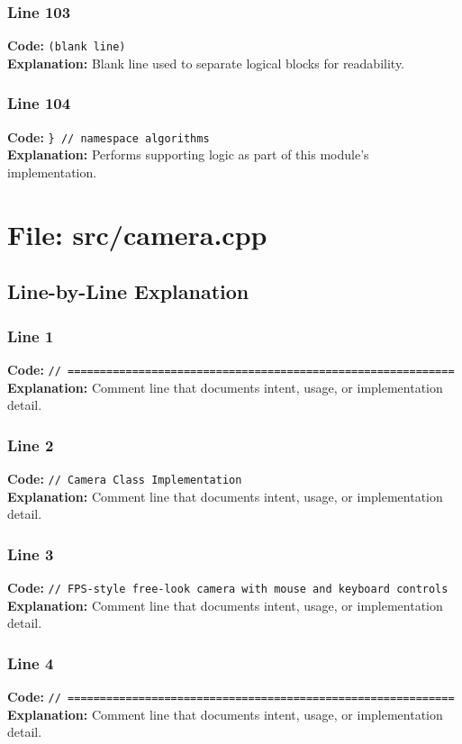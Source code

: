 \documentclass[11pt,a4paper]{article}
\begin{document}
\subsubsection*{Line 103}
\textbf{Code:} \texttt{(blank line)}\\
\textbf{Explanation:} Blank line used to separate logical blocks for readability.

\subsubsection*{Line 104}
\textbf{Code:} \verb|} // namespace algorithms|\\
\textbf{Explanation:} Performs supporting logic as part of this module's implementation.

\newpage
\section{File: src/camera.cpp}
\subsection{Line-by-Line Explanation}
\subsubsection*{Line 1}
\textbf{Code:} \verb|// ============================================================|\\
\textbf{Explanation:} Comment line that documents intent, usage, or implementation detail.

\subsubsection*{Line 2}
\textbf{Code:} \verb|// Camera Class Implementation|\\
\textbf{Explanation:} Comment line that documents intent, usage, or implementation detail.

\subsubsection*{Line 3}
\textbf{Code:} \verb|// FPS-style free-look camera with mouse and keyboard controls|\\
\textbf{Explanation:} Comment line that documents intent, usage, or implementation detail.

\subsubsection*{Line 4}
\textbf{Code:} \verb|// ============================================================|\\
\textbf{Explanation:} Comment line that documents intent, usage, or implementation detail.
\end{document}
